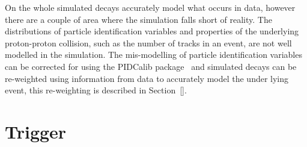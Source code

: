 On the whole simulated decays accurately model what occurs in data, however there are a couple of area where the simulation falls short of reality.
The distributions of particle identification variables and properties of the underlying proton-proton collision, such as the number of tracks in an event, are not well modelled in the simulation. %
The mis-modelling of particle identification variables can be corrected for using the PIDCalib package~\cite{} and simulated decays can be re-weighted using information from data to accurately model the under lying event, this re-weighting is described in Section~\ref{}. 


\section{Trigger}
\label{sec:triggerRequirements}


